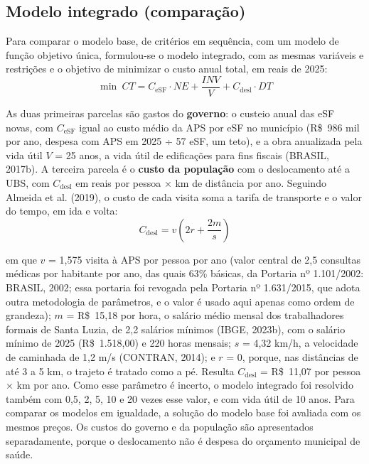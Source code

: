 \documentclass[11pt,a4paper]{article}
\begin{document}
\subsection{Modelo integrado (comparação)}\label{sec:3.6}

Para comparar o modelo base, de critérios em sequência, com um modelo de função objetivo única, formulou-se o modelo integrado, com as mesmas variáveis e restrições e o objetivo de minimizar o custo anual total, em reais de 2025:
\begin{equation}
\min\ \mathit{CT} = C_{\mathrm{eSF}} \cdot \mathit{NE} + \frac{\mathit{INV}}{V} + C_{\mathrm{desl}} \cdot \mathit{DT}
\end{equation}

As duas primeiras parcelas são gastos do \textbf{governo}: o custeio anual das eSF novas, com $C_{\mathrm{eSF}}$ igual ao custo médio da APS por eSF no município (R\$~986 mil por ano, despesa com APS em 2025 ÷ 57 eSF, um teto), e a obra anualizada pela vida útil $V$ = 25 anos, a vida útil de edificações para fins fiscais (BRASIL, 2017b). A terceira parcela é o \textbf{custo da população} com o deslocamento até a UBS, com $C_{\mathrm{desl}}$ em reais por pessoa × km de distância por ano. Seguindo Almeida et al. (2019), o custo de cada visita soma a tarifa de transporte e o valor do tempo, em ida e volta:
\begin{equation}
C_{\mathrm{desl}} = v \left( 2r + \frac{2m}{s} \right)
\end{equation}

\noindent em que $v$ = 1,575 visita à APS por pessoa por ano (valor central de 2,5 consultas médicas por habitante por ano, das quais 63\% básicas, da Portaria nº 1.101/2002: BRASIL, 2002; essa portaria foi revogada pela Portaria nº 1.631/2015, que adota outra metodologia de parâmetros, e o valor é usado aqui apenas como ordem de grandeza); $m$ = R\$~15,18 por hora, o salário médio mensal dos trabalhadores formais de Santa Luzia, de 2,2 salários mínimos (IBGE, 2023b), com o salário mínimo de 2025 (R\$~1.518,00) e 220 horas mensais; $s$ = 4,32 km/h, a velocidade de caminhada de 1,2 m/s (CONTRAN, 2014); e $r$ = 0, porque, nas distâncias de até 3 a 5 km, o trajeto é tratado como a pé. Resulta $C_{\mathrm{desl}}$ = R\$~11,07 por pessoa × km por ano. Como esse parâmetro é incerto, o modelo integrado foi resolvido também com 0,5, 2, 5, 10 e 20 vezes esse valor, e com vida útil de 10 anos. Para comparar os modelos em igualdade, a solução do modelo base foi avaliada com os mesmos preços. Os custos do governo e da população são apresentados separadamente, porque o deslocamento não é despesa do orçamento municipal de saúde.
\end{document}
